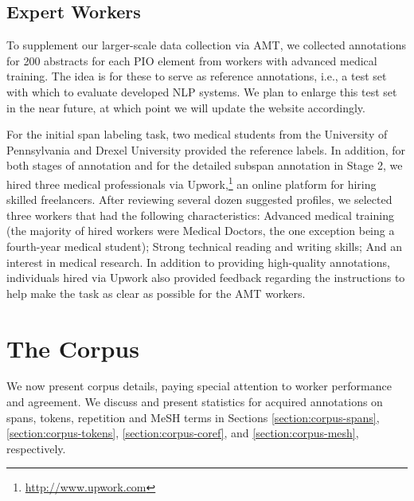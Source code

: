 \documentclass[11pt,a4paper]{article}
\newenvironment{tight_enumerate}{
\begin{enumerate}[leftmargin=4.0mm]
  \setlength{\itemsep}{0pt}
  \setlength{\parskip}{0pt}
}{\end{enumerate}}
\begin{document}
\subsection{Expert Workers}

To supplement our larger-scale data collection via AMT, we collected annotations for 200 abstracts for each PIO element from workers with advanced medical training. The idea is for these to serve as reference annotations, i.e., a test set with which to evaluate developed NLP systems. We plan to enlarge this test set in the near future, at which point we will update the website accordingly. 

For the initial span labeling task, two medical students from the University of Pennsylvania and Drexel University provided the reference labels. In addition, for both stages of annotation and for the detailed subspan annotation in Stage 2, we hired three medical professionals via Upwork,\footnote{\url{http://www.upwork.com}} an online platform for hiring skilled freelancers. After reviewing several dozen suggested profiles, we selected three workers that had the following characteristics: Advanced medical training (the majority of hired workers were Medical Doctors, the one exception being a fourth-year medical student); Strong technical reading and writing skills; And an interest in medical research. In addition to providing high-quality annotations, individuals hired via Upwork also provided feedback regarding the instructions to help make the task as clear as possible for the AMT workers.



\begin{comment}
\begin{tight_enumerate}\item Advanced medical training
\item Strong technical reading and writing skills
\item An interest in medical research
\end{tight_enumerate}
\end{comment}


\section{The Corpus}
\label{section:the-corpus}

We now present corpus details, paying special attention to worker performance and agreement. We discuss and present statistics for acquired annotations on spans, tokens, repetition and MeSH terms in Sections \ref{section:corpus-spans}, \ref{section:corpus-tokens}, \ref{section:corpus-coref}, and \ref{section:corpus-mesh}, respectively.
\end{document}
